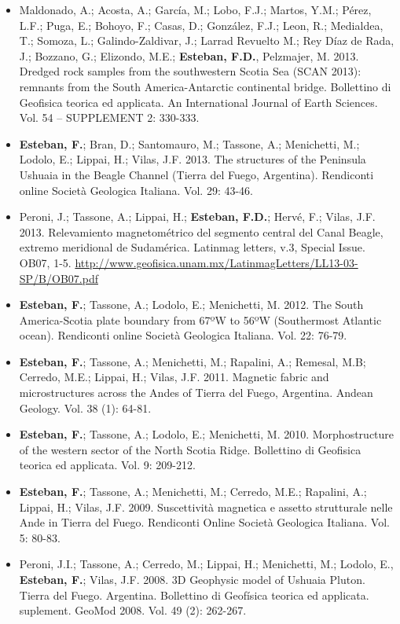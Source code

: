 \documentclass[11pt, a4paper]{article}
\begin{document}
\begin{itemize}
    \item Maldonado, A.; Acosta, A.; García, M.; Lobo, F.J.; Martos, Y.M.; Pérez, L.F.; Puga, E.; Bohoyo, F.; Casas, D.; González, F.J.; Leon, R.; Medialdea, T.; Somoza, L.; Galindo-Zaldivar, J.; Larrad Revuelto M.; Rey Díaz de Rada, J.; Bozzano, G.; Elizondo, M.E.; \textbf{Esteban, F.D.}, Pelzmajer, M. 2013. Dredged rock samples from the southwestern Scotia Sea (SCAN 2013): remnants from the South America-Antarctic continental bridge. Bollettino di Geofisica teorica ed applicata. An International Journal of Earth Sciences. Vol. 54 – SUPPLEMENT 2: 330-333.
    \item \textbf{Esteban, F.}; Bran, D.; Santomauro, M.; Tassone, A.; Menichetti, M.; Lodolo, E.; Lippai, H.; Vilas, J.F. 2013. The structures of the Peninsula Ushuaia in the Beagle Channel (Tierra del Fuego, Argentina). Rendiconti online Società Geologica Italiana. Vol. 29: 43-46.
    \item Peroni, J.; Tassone, A.; Lippai, H.; \textbf{Esteban, F.D.}; Hervé, F.; Vilas, J.F. 2013. Relevamiento magnetométrico del segmento central del Canal Beagle, extremo meridional de Sudamérica. Latinmag letters, v.3, Special Issue. OB07, 1-5. \url{http://www.geofisica.unam.mx/LatinmagLetters/LL13-03-SP/B/OB07.pdf}
    \item \textbf{Esteban, F.}; Tassone, A.; Lodolo, E.; Menichetti, M. 2012. The South America-Scotia plate boundary from 67ºW to 56ºW (Southermost Atlantic ocean). Rendiconti online Società Geologica Italiana. Vol. 22: 76-79.
    \item \textbf{Esteban, F.}; Tassone, A.; Menichetti, M.; Rapalini, A.; Remesal, M.B; Cerredo, M.E.; Lippai, H.; Vilas, J.F. 2011. Magnetic fabric and microstructures across the Andes of Tierra del Fuego, Argentina. Andean Geology. Vol. 38 (1): 64-81.
    \item \textbf{Esteban, F.}; Tassone, A.; Lodolo, E.; Menichetti, M. 2010. Morphostructure of the western sector of the North Scotia Ridge. Bollettino di Geofisica teorica ed applicata. Vol. 9: 209-212.
    \item \textbf{Esteban, F.}; Tassone, A.; Menichetti, M.; Cerredo, M.E.; Rapalini, A.; Lippai, H.; Vilas, J.F. 2009. Suscettività magnetica e assetto strutturale nelle Ande in Tierra del Fuego. Rendiconti Online Società Geologica Italiana. Vol. 5: 80-83.
    \item Peroni, J.I.; Tassone, A.; Cerredo, M.; Lippai, H.; Menichetti, M.; Lodolo, E., \textbf{Esteban, F.}; Vilas, J.F. 2008. 3D Geophysic model of Ushuaia Pluton. Tierra del Fuego. Argentina. Bollettino di Geofísica teorica ed applicata. suplement. GeoMod 2008. Vol. 49 (2): 262-267.
\end{itemize}
\end{document}
